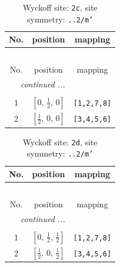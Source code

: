 \documentclass[fleqn,8pt]{jsarticle}
\begin{document}
\renewcommand{\arraystretch}{1.2}
\begin{longtable}{ccc}
\caption{Wyckoff site: {\tt 2c}, site symmetry: {\tt ..2/m'}}
 \\
 \hline \hline
No. & position & mapping \\ \hline \endfirsthead

\multicolumn{2}{l}{\tablename\ \thetable{}} \\
 \hline \hline
No. & position & mapping \\ \hline \endhead

 \hline \hline
\multicolumn{2}{r}{\footnotesize\it continued ...} \\ \endfoot

 \hline \hline
\multicolumn{2}{r}{} \\ \endlastfoot

1 & $\left[ 0,\, \frac{1}{2},\, 0 \right]$ & {\tt [1,2,7,8]} \\ \hline
2 & $\left[ \frac{1}{2},\, 0,\, 0 \right]$ & {\tt [3,4,5,6]} \\
\end{longtable}
\renewcommand{\arraystretch}{1.2}
\begin{longtable}{ccc}
\caption{Wyckoff site: {\tt 2d}, site symmetry: {\tt ..2/m'}}
 \\
 \hline \hline
No. & position & mapping \\ \hline \endfirsthead

\multicolumn{2}{l}{\tablename\ \thetable{}} \\
 \hline \hline
No. & position & mapping \\ \hline \endhead

 \hline \hline
\multicolumn{2}{r}{\footnotesize\it continued ...} \\ \endfoot

 \hline \hline
\multicolumn{2}{r}{} \\ \endlastfoot

1 & $\left[ 0,\, \frac{1}{2},\, \frac{1}{2} \right]$ & {\tt [1,2,7,8]} \\ \hline
2 & $\left[ \frac{1}{2},\, 0,\, \frac{1}{2} \right]$ & {\tt [3,4,5,6]} \\
\end{longtable}
\renewcommand{\arraystretch}{1.2}
\end{document}
